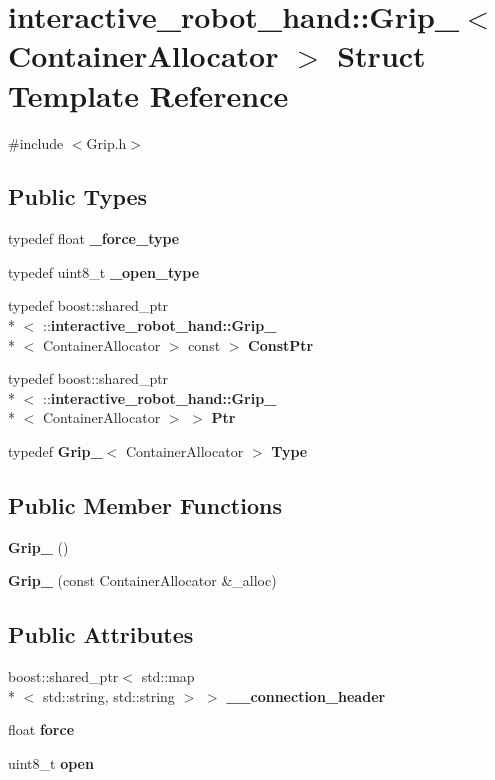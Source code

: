 \section{interactive\-\_\-robot\-\_\-hand\-:\-:Grip\-\_\-$<$ Container\-Allocator $>$ Struct Template Reference}
\label{structinteractive__robot__hand_1_1Grip__}


{\ttfamily \#include $<$Grip.\-h$>$}

\subsection*{Public Types}
\begin{DoxyCompactItemize}
\item 
typedef float {\bf \-\_\-force\-\_\-type}
\item 
typedef uint8\-\_\-t {\bf \-\_\-open\-\_\-type}
\item 
typedef boost\-::shared\-\_\-ptr\\*
$<$ \-::{\bf interactive\-\_\-robot\-\_\-hand\-::\-Grip\-\_\-}\\*
$<$ Container\-Allocator $>$ const  $>$ {\bf Const\-Ptr}
\item 
typedef boost\-::shared\-\_\-ptr\\*
$<$ \-::{\bf interactive\-\_\-robot\-\_\-hand\-::\-Grip\-\_\-}\\*
$<$ Container\-Allocator $>$ $>$ {\bf Ptr}
\item 
typedef {\bf Grip\-\_\-}$<$ Container\-Allocator $>$ {\bf Type}
\end{DoxyCompactItemize}
\subsection*{Public Member Functions}
\begin{DoxyCompactItemize}
\item 
{\bf Grip\-\_\-} ()
\item 
{\bf Grip\-\_\-} (const Container\-Allocator \&\-\_\-alloc)
\end{DoxyCompactItemize}
\subsection*{Public Attributes}
\begin{DoxyCompactItemize}
\item 
boost\-::shared\-\_\-ptr$<$ std\-::map\\*
$<$ std\-::string, std\-::string $>$ $>$ {\bf \-\_\-\-\_\-connection\-\_\-header}
\item 
float {\bf force}
\item 
uint8\-\_\-t {\bf open}
\end{DoxyCompactItemize}



